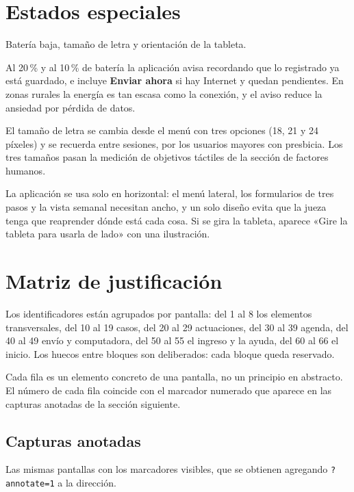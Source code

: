 \documentclass[11pt,a4paper]{article}
\begin{document}
\section{Estados especiales}

Batería baja, tamaño de letra y orientación de la tableta.

Al 20\,\% y al 10\,\% de batería la aplicación avisa recordando que lo registrado ya está guardado, e incluye \textbf{Enviar ahora} si hay Internet y quedan pendientes. En zonas rurales la energía es tan escasa como la conexión, y el aviso reduce la ansiedad por pérdida de datos.

El tamaño de letra se cambia desde el menú con tres opciones (18, 21 y 24 píxeles) y se recuerda entre sesiones, por los usuarios mayores con presbicia. Los tres tamaños pasan la medición de objetivos táctiles de la sección de factores humanos.

La aplicación se usa solo en horizontal: el menú lateral, los formularios de tres pasos y la vista semanal necesitan ancho, y un solo diseño evita que la jueza tenga que reaprender dónde está cada cosa. Si se gira la tableta, aparece «Gire la tableta para usarla de lado» con una ilustración.



\section{Matriz de justificación}

Los identificadores están agrupados por pantalla: del 1 al 8 los elementos transversales, del 10 al 19 casos, del 20 al 29 actuaciones, del 30 al 39 agenda, del 40 al 49 envío y computadora, del 50 al 55 el ingreso y la ayuda, del 60 al 66 el inicio. Los huecos entre bloques son deliberados: cada bloque queda reservado.

Cada fila es un elemento concreto de una pantalla, no un principio en abstracto. El número de cada fila coincide con el marcador numerado que aparece en las capturas anotadas de la sección siguiente.

\begin{landscape}

\end{landscape}

\subsection{Capturas anotadas}

Las mismas pantallas con los marcadores visibles, que se obtienen agregando \texttt{?annotate=1} a la dirección.
\end{document}
